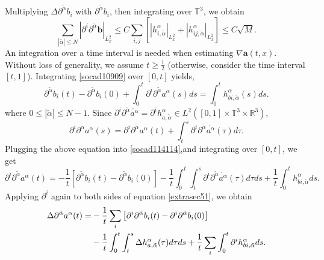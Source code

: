 \documentclass[reqno]{amsart}
\numberwithin{equation}{section}
\numberwithin{equation}{section}
\begin{document}
		Multiplying $\Delta \partial^{\tilde{\alpha}} b_i$ with $\partial^{\tilde{\alpha}} b_i$, then integrating over $\mathbb{T}^3$, we obtain
		\begin{equation}
		\sum_{|\tilde{\alpha}| \leq N} \left| \partial^i \partial^{\tilde{\alpha}} \mathbf{b} \right|_{L_x^2} \leq C \sum_{i,j} \left[ | h_{i,\tilde{\alpha}}^\alpha |_{L_x^2} + | h_{ij,\tilde{\alpha}}^\alpha |_{L_x^2} \right] \leq C \sqrt{M}. \label{soedc113113}
		\end{equation}
		An integration over a time interval is needed when estimating $\nabla\mathbf{a}(t,x)$. Without loss of generality, we assume $t \geq \frac{1}{2}$ (otherwise, consider the time interval $[t, 1]$). Integrating \eqref{socad10909} over $[0, t]$ yields,
		\begin{equation}
		\partial^{\tilde{\alpha}} b_i(t) - \partial^{\tilde{\alpha}} b_i(0) + \int_0^t \partial^i \partial^{\tilde{\alpha}} a^{\alpha}(s) ds = \int_0^t h_{bi,\tilde{\alpha}}^\alpha(s) ds. \label{socad114114}
		\end{equation}
		where $0 \leq |\tilde{\alpha}| \le N - 1$. Since $\partial^i \partial^{\tilde{\alpha}} \dot{a^{\alpha}} = \partial^i h_{a,\tilde{\alpha}}^\alpha \in L^2([0, 1] \times \mathbb{T}^3 \times \mathbb{R}^3)$, 
		$$
		\partial^i \partial^{\tilde{\alpha}} a^{\alpha}(s) = \partial^i \partial^{\tilde{\alpha}} a^{\alpha}(t) + \int_t^s \partial^i \partial^{\tilde{\alpha}}  \dot{a^{\alpha}}(\tau) d\tau.
		$$
		Plugging the above equation into \eqref{socad114114},and integrating over $[0, t]$, we get
		\begin{equation}
		\partial^i \partial^{\tilde{\alpha}} a^{\alpha}(t) = -\frac{1}{t} \left[ \partial^{\tilde{\alpha}} b_i(t) - \partial^{\tilde{\alpha}} b_i(0) \right] - \frac{1}{t} \int_0^t \int_t^s \partial^i \partial^{\tilde{\alpha}}  \dot{a^{\alpha}}(\tau) d\tau ds + \frac{1}{t} \int_0^t h_{bi,\tilde{\alpha}}^\alpha ds.\label{extrasec51}
		\end{equation}
		 Applying  $\partial^i$ again to both sides of equation \eqref{extrasec51}, we obtain
		\begin{align}
		\Delta\partial^{\tilde{\alpha}} a^{\alpha}(t) =& -\frac{1}{t} \sum_i \left[ \partial^i \partial^{\tilde{\alpha}} b_i(t) - \partial^i \partial^{\tilde{\alpha}} b_i(0) \right] \notag\\
		&- \frac{1}{t} \int_0^t \int_t^s \Delta h_{a,\tilde{\alpha}}^\alpha(\tau) d\tau ds + \frac{1}{t} \sum_i \int_0^t \partial^i h_{bi,\tilde{\alpha}}^\alpha ds. \label{extrel529}
		\end{align}
\end{document}

